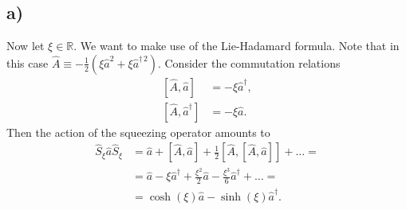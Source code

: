 \documentclass[english, parskip=full]{scrartcl}
\newcommand{\kla}{}
\newcommand{\klam}{}
\begin{document}
\subsection*{a)}
Now let $\xi\in\mathbb{R}$. 
We want to make use of the Lie-Hadamard formula.
Note that in this case $\hat{A}\equiv -\frac{1}{2}\kla\left( \xi\hat{a}^2+\xi\hat{a}^{\dagger\,2} \right)$.
Consider the commutation relations
\begin{align}
\klam\left[ \hat{A}, \hat{a} \right] &= -\xi\hat{a}^\dagger,\\
\klam\left[ \hat{A}, \hat{a}^\dagger \right] &= -\xi\hat{a}.
\end{align}
Then the action of the squeezing operator amounts to
\begin{align}
\hat{S}_\xi\hat{a}\hat{S}_\xi &= \hat{a} + \klam\left[ \hat{A}, \hat{a} \right] + \frac{1}{2}\klam\left[ \hat{A}, \klam\left[ \hat{A}, \hat{a} \right] \right]+\dots=\\
&=\hat{a}-\xi\hat{a}^\dagger + \frac{\xi^2}{2}\hat{a} - \frac{\xi^3}{6}\hat{a}^\dagger +\dots = \\
&=\cosh(\xi)\hat{a}-\sinh(\xi)\hat{a}^\dagger.
\end{align}
\end{document}
